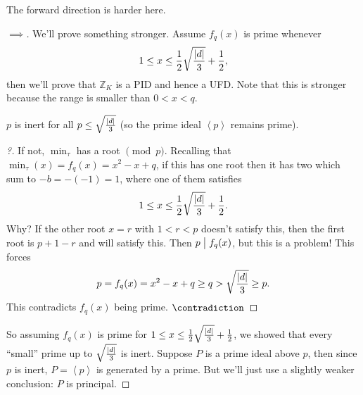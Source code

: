 \begin{remark}

The forward direction is harder here.

\end{remark}

\begin{proof}[$\implies$]

We'll prove something stronger. Assume \(f_q(x)\) is prime whenever
\begin{align*}
1 \leq x \leq {1\over 2} \sqrt{ {\left\lvert {d} \right\rvert} \over 3 } + {1 \over 2}
,\end{align*}
then we'll prove that \({\mathbb{Z}}_K\) is a PID and hence a UFD. Note
that this is stronger because the range is smaller than \(0<x<q\).

\begin{claim}

\(p\) is inert for all
\(p \leq \sqrt{ {\left\lvert {d} \right\rvert}\over 3 }\) (so the prime
ideal \(\left\langle{ p }\right\rangle\) remains prime).

\end{claim}

\begin{proof}[?]

If not, \(\min_\tau\) has a root \(\pmod p\). Recalling that
\(\min_\tau(x) = f_q(x) = x^2 - x + q\), if this has one root then it
has two which sum to \(-b = -(-1) = 1\), where one of them satisfies
\begin{align*}
1 \leq x \leq {1\over 2} \sqrt{ {\left\lvert {d} \right\rvert} \over 3 } + {1\over 2}
.\end{align*}
Why? If the other root \(x = r\) with \(1<r<p\) doesn't satisfy this,
then the first root is \(p+1-r\) and will satisfy this. Then
\(p\bigm|f_q(x)\), but this is a problem! This forces
\begin{align*}
p = f_q(x) = x^2 - x + q \geq q > \sqrt{{\left\lvert {d} \right\rvert} \over 3 } \geq p
.\end{align*}
This contradicts \(f_q(x)\) being prime. \(\contradiction\)

\end{proof}

So assuming \(f_q(x)\) is prime for
\(1 \leq x \leq {1 \over 2 } \sqrt{{\left\lvert {d} \right\rvert}\over 3 } + {1 \over 2}\),
we showed that every ``small'' prime up to
\(\sqrt{{\left\lvert {d} \right\rvert}\over 3 }\) is inert. Suppose
\(P\) is a prime ideal above \(p\), then since \(p\) is inert,
\(P = \left\langle{ p }\right\rangle\) is generated by a prime. But
we'll just use a slightly weaker conclusion: \(P\) is principal.


\end{proof}
